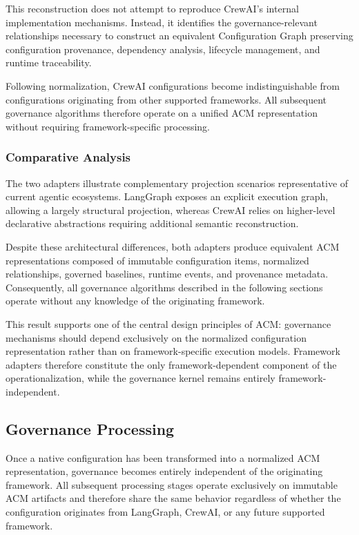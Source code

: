 \documentclass[10pt]{article}
\begin{document}
This reconstruction does not attempt to reproduce CrewAI's internal implementation mechanisms. Instead, it identifies the governance-relevant relationships necessary to construct an equivalent Configuration Graph preserving configuration provenance, dependency analysis, lifecycle management, and runtime traceability.

Following normalization, CrewAI configurations become indistinguishable from configurations originating from other supported frameworks. All subsequent governance algorithms therefore operate on a unified ACM representation without requiring framework-specific processing.



\subsubsection{Comparative Analysis}

The two adapters illustrate complementary projection scenarios representative of current agentic ecosystems. LangGraph exposes an explicit execution graph, allowing a largely structural projection, whereas CrewAI relies on higher-level declarative abstractions requiring additional semantic reconstruction.

Despite these architectural differences, both adapters produce equivalent ACM representations composed of immutable configuration items, normalized relationships, governed baselines, runtime events, and provenance metadata. Consequently, all governance algorithms described in the following sections operate without any knowledge of the originating framework.

This result supports one of the central design principles of ACM: governance mechanisms should depend exclusively on the normalized configuration representation rather than on framework-specific execution models. Framework adapters therefore constitute the only framework-dependent component of the operationalization, while the governance kernel remains entirely framework-independent.

\subsection{Governance Processing}
\label{sec:governance_algorithms}

Once a native configuration has been transformed into a normalized ACM representation, governance becomes entirely independent of the originating framework. All subsequent processing stages operate exclusively on immutable ACM artifacts and therefore share the same behavior regardless of whether the configuration originates from LangGraph, CrewAI, or any future supported framework.
\end{document}
